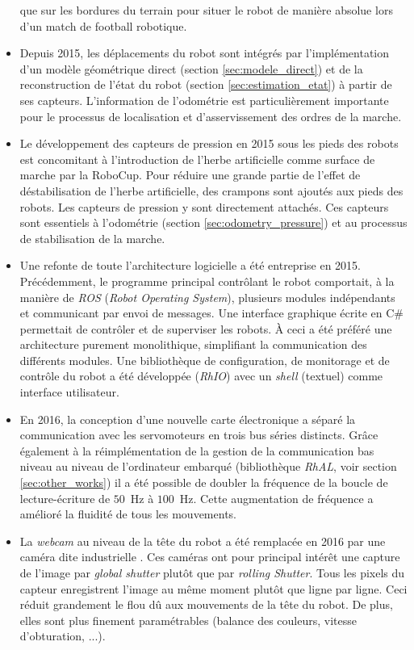 \begin{itemize}
        que sur les bordures du terrain pour situer le robot de manière absolue 
        lors d'un match de football robotique.
    \item Depuis 2015, les déplacements du robot sont intégrés par l'implémentation 
        d'un modèle géométrique direct (section \ref{sec:modele_direct}) 
        et de la reconstruction de l'état du robot (section \ref{sec:estimation_etat})
        à partir de ses capteurs.
        L'information de l'odométrie est particulièrement importante 
        pour le processus de localisation et d'asservissement des ordres de la marche.
    \item Le développement des capteurs de pression en 2015 sous les pieds des robots
        est concomitant à l'introduction de l'herbe artificielle comme surface de marche
        par la RoboCup.
        Pour réduire une grande partie de l'effet de déstabilisation de l'herbe artificielle, 
        des crampons sont ajoutés aux pieds des robots.
        Les capteurs de pression y sont directement attachés. 
        Ces capteurs sont essentiels à l'odométrie (section \ref{sec:odometry_pressure}) 
        et au processus de stabilisation de la marche.
    \item Une refonte de toute l'architecture logicielle a été entreprise en 2015.
        Précédemment, le programme principal contrôlant le robot comportait, à la manière 
        de \textit{ROS} (\textit{Robot Operating System}), 
        plusieurs modules indépendants et communicant par envoi de messages.
        Une interface graphique écrite en C\# permettait de contrôler et 
        de superviser les robots.
        À ceci a été préféré une architecture purement monolithique, simplifiant
        la communication des différents modules.
        Une bibliothèque de configuration, de monitorage et de contrôle du robot a été
        développée (\textit{RhIO}) avec un \textit{shell} (textuel) comme interface 
        utilisateur.
    \item En 2016, la conception d'une nouvelle carte électronique a
        séparé la communication avec les servomoteurs en trois bus séries distincts.
        Grâce également à la réimplémentation de la gestion de la communication bas niveau 
        au niveau de l'ordinateur embarqué (bibliothèque \textit{RhAL}, 
        voir section \ref{sec:other_works})
        il a été possible de doubler la fréquence de la boucle de lecture-écriture 
        de $50$~Hz à $100$~Hz.
        Cette augmentation de fréquence a amélioré la fluidité de tous les mouvements.
    \item La \textit{webcam} au niveau de la tête du robot a été remplacée en 2016
        par une caméra dite \og industrielle \fg. 
        Ces caméras ont pour principal intérêt une capture de l'image par 
        \textit{global shutter} plutôt que par \textit{rolling Shutter}.
        Tous les pixels du capteur enregistrent l'image au même moment plutôt que
        ligne par ligne.
        Ceci réduit grandement le flou dû aux mouvements de la tête du robot.
        De plus, elles sont plus finement paramétrables 
        (balance des couleurs, vitesse d'obturation, ...).
        

\end{itemize}
